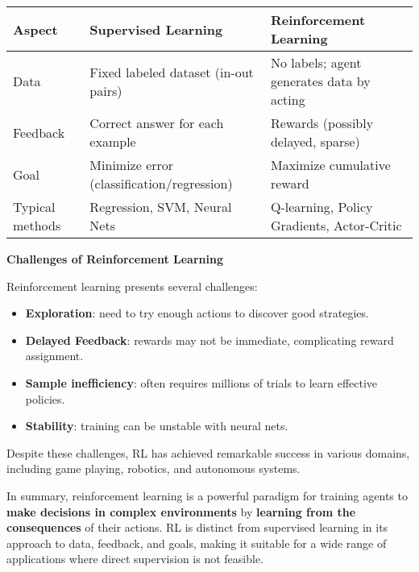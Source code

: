 \begin{table}[!htp]
    \centering
    \begin{tabular}{@{} p{1.5cm} p{4.5cm} p{4.5cm} @{}}
        \toprule
        Aspect & Supervised Learning & Reinforcement Learning \\
        \midrule
        Data & Fixed labeled dataset (in-out pairs) & No labels; agent generates data by acting \\[.3em]
        Feedback & Correct answer for each example & Rewards (possibly delayed, sparse) \\[.3em]
        Goal & Minimize error (classification/regression) & Maximize cumulative reward \\[.3em]
        Typical methods & Regression, SVM, Neural Nets & Q-learning, Policy Gradients, Actor-Critic \\
        \bottomrule
    \end{tabular}
\end{table}

\begin{flushleft}
    \textcolor{Red2}{ \textbf{Challenges of Reinforcement Learning}}
\end{flushleft}
Reinforcement learning presents several challenges:
\begin{itemize}
    \item \textbf{Exploration}: need to try enough actions to discover good strategies.
    \item \textbf{Delayed Feedback}: rewards may not be immediate, complicating reward assignment.
    \item \textbf{Sample inefficiency}: often requires millions of trials to learn effective policies.
    \item \textbf{Stability}: training can be unstable with neural nets.
\end{itemize}
Despite these challenges, RL has achieved remarkable success in various domains, including game playing, robotics, and autonomous systems.

\highspace
In summary, reinforcement learning is a powerful paradigm for training agents to \textbf{make decisions in complex environments} by \textbf{learning from the consequences} of their actions. RL is distinct from supervised learning in its approach to data, feedback, and goals, making it suitable for a wide range of applications where direct supervision is not feasible.